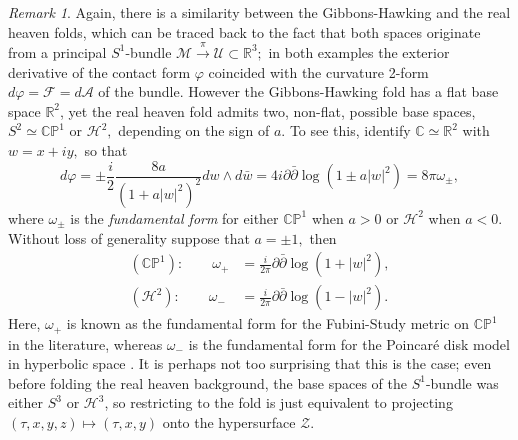 \documentclass[a4paper,12pt, onecolumn, notitlepage]{article}
\theoremstyle{definition}
\theoremstyle{remark}
\newtheorem{rmk}[thm]{Remark}
\newcommand{\w}{\omega}
\newcommand{\vp}{\varphi}
\begin{document}
\begin{rmk}
	Again, there is a similarity between the Gibbons-Hawking and the real heaven folds, which can be traced back to the fact that both spaces originate from a principal $S^{1}$-bundle $\mathcal{M}\overset{\pi}{\rightarrow}\mathcal{U}\subset\mathbb{R}^{3};$ in both examples the exterior derivative of the contact form $\vp$ coincided with the curvature 2-form $d\vp=\mathcal{F}=d\mathcal{A}$ of the bundle. However the Gibbons-Hawking fold has a flat base space $\mathbb{R}^{2}$, yet the real heaven fold admits two, non-flat, possible base spaces, $S^{2}\simeq \mathbb{CP}^{1}$ or $\mathcal{H}^{2},$ depending on the sign of $a.$ To see this, identify $\mathbb{C}\simeq\mathbb{R}^{2}$ with $w=x+iy,$ so that
	\begin{equation}
		d\vp=\pm\frac{i}{2}\frac{8a}{(1+a|w|^{2})^{2}}dw\wedge d\bar{w} = 4i\partial\bar{\partial}\log(1\pm a|w|^{2}) = 8\pi\w_{\pm},
	\end{equation}
	where $\w_{\pm}$ is the \emph{fundamental form} for either $\mathbb{CP}^{1}$ when $a>0$ or $\mathcal{H}^{2}$ when $a<0.$ Without loss of generality suppose that $a = \pm 1,$ then
	\begin{align*}
		(\mathbb{CP}^{1}):\qquad \w_{+} &= \frac{i}{2\pi}\partial\bar{\partial}\log(1+|w|^{2}),\\
		\label{poincare}
		(\mathcal{H}^{2}):\qquad \w_{-} &= \frac{i}{2\pi}\partial\bar{\partial}\log(1-|w|^{2}).
	\end{align*} 
	Here, $\w_{+}$ is known as the fundamental form for the Fubini-Study metric on $\mathbb{CP}^{1}$ in the literature, whereas $\w_{-}$ is the fundamental form for the Poincar\'{e} disk model in hyperbolic space \cite{huybrechts_2005}. It is perhaps not too surprising that this is the case; even before folding the real heaven background, the base spaces of the $S^{1}$-bundle was either $S^{3}$ or $\mathcal{H}^{3}$, so restricting to the fold is just equivalent to projecting $(\tau, x, y, z)\mapsto(\tau, x, y)$ onto the hypersurface $\mathcal{Z}.$
\end{rmk}
\end{document}
